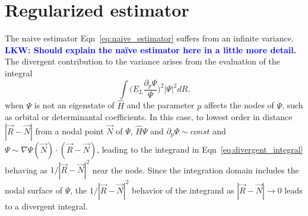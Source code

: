 \documentclass[twocolumn]{revtex4-1}
\newcommand{\lucas}[1]{\textbf{\textcolor{blue}{LKW: #1}}}
\begin{document}
\section{Regularized estimator}
The naive estimator Eqn~\ref{eq:naive_estimator} suffers from an infinite variance. 
\lucas{Should explain the na\"ive estimator here in a little more detail. } 
The divergent contribution to the variance arises from the evaluation of the integral
\begin{equation}
\int \Big(E_L\frac{\partial_p\Psi}{\Psi}\Big)^2 |\Psi|^2 dR.
\label{eq:divergent_integral}
\end{equation}
when $\Psi$ is not an eigenstate of $\hat{H}$ and the parameter $p$ affects the nodes of $\Psi$, such as orbital or determinantal coefficients.
In this case, to lowest order in distance $|\vec{R}-\vec{N}|$ from a nodal point $\vec{N}$ of $\Psi$, $\hat{H}\Psi$ and $\partial_p \Psi \sim const$ and $\Psi \sim \nabla \Psi(\vec{N}) \cdot (\vec{R} - \vec{N})$, leading to the integrand in Eqn~\ref{eq:divergent_integral} behaving as $1/|\vec{R}-\vec{N}|^2$ near the node.
Since the integration domain includes the nodal surface of $\Psi$, the $1/|\vec{R}-\vec{N}|^2$ behavior of the integrand as $|\vec{R}-\vec{N}|\rightarrow 0$ leads to a divergent integral.
\end{document}
